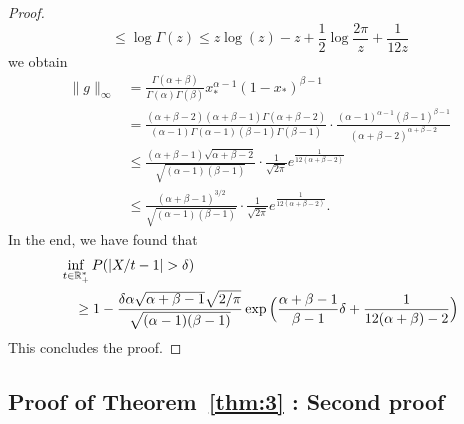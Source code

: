 \documentclass{article}
\newcommand{\1}{\boldsymbol{1}}
\theoremstyle{plain}
\begin{document}
\begin{proof}
\begin{equation*}
    \leq \log\Gamma(z) \leq z\log(z) - z + \frac{1}{2}\log\frac{2\pi}{z}%
    + \frac{1}{12 z}
  \end{equation*}
  we obtain
  \begin{align*}
    \|g\|_{\infty}%
    &= \frac{\Gamma(\alpha + \beta)}{\Gamma(\alpha)\Gamma(\beta)}%
      x_{*}^{\alpha-1}(1 - x_{*})^{\beta-1}\\
    &= \frac{(\alpha + \beta -2)(\alpha + \beta -1)\Gamma(\alpha + \beta-2)}{(\alpha-1)\Gamma(\alpha-1)(\beta-1)\Gamma(\beta-1)}\cdot%
      \frac{(\alpha-1)^{\alpha-1}(\beta - 1)^{\beta-1}}{(\alpha + \beta-2)^{\alpha + \beta-2}}\\
    &\leq \frac{(\alpha + \beta -1)\sqrt{\alpha + \beta -2}}{\sqrt{(\alpha-1)(\beta-1)}}\cdot%
      \frac{1}{\sqrt{2\pi}}e^{\frac{1}{12(\alpha + \beta - 2)}}\\
    &\leq \frac{(\alpha + \beta -1)^{3/2}}{\sqrt{(\alpha-1)(\beta - 1)}}\cdot%
      \frac{1}{\sqrt{2\pi}}e^{\frac{1}{12(\alpha + \beta - 2)}}.
  \end{align*}
  In the end, we have found that
  \begin{align*}
    &\inf_{t\in \NNReals^{*}}P(|X/t - 1| > \delta)\\%
    &\quad\geq 1 - %
    \frac{\delta \alpha \sqrt{\alpha + \beta -1} \sqrt{2/\pi}}{\sqrt{(\alpha-1)(\beta-1)}}%
    \exp\Big( \frac{\alpha + \beta-1}{\beta-1}\delta+ \frac{1}{12(\alpha + \beta)-2} \Big)
  \end{align*}
  This concludes the proof.
\end{proof}




\subsection{Proof of Theorem~\ref{thm:3} : Second proof}
\label{sec:proof-theor-refthm:3:alternative}
\end{document}
